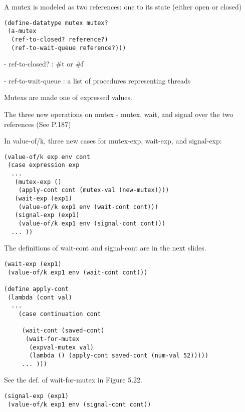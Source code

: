 \documentclass{article}
\begin{document}
\begin{huge}

A mutex is modeled as two references: one to its state (either open or closed)

\begin{lstlisting}
(define-datatype mutex mutex?
 (a-mutex
  (ref-to-closed? reference?)
  (ref-to-wait-queue reference?)))
\end{lstlisting}

- ref-to-closed? : \#t or \#f 

- ref-to-wait-queue : a list of procedures representing threads

Mutexs are made one of expressed values.

The three new operations on mutex \al
- mutex, wait, and signal over the two references (See P.187)


In value-of/k, three new cases for mutex-exp, wait-exp, and signal-exp:
\begin{lstlisting}
(value-of/k exp env cont
 (case expression exp 
  ...
   (mutex-exp ()
    (apply-cont cont (mutex-val (new-mutex))))
   (wait-exp (exp1)
    (value-of/k exp1 env (wait-cont cont)))
   (signal-exp (exp1)
    (value-of/k exp1 env (signal-cont cont)))
  ... ))
\end{lstlisting}

The definitions of wait-cont and signal-cont are in the next slides.


\begin{lstlisting}
(wait-exp (exp1)
 (value-of/k exp1 env (wait-cont cont)))

(define apply-cont
 (lambda (cont val)
  ...
    (case continuation cont
    
     (wait-cont (saved-cont)
      (wait-for-mutex
       (expval-mutex val)
       (lambda () (apply-cont saved-cont (num-val 52)))))
     ... )))
 \end{lstlisting}
 
 See the def. of wait-for-mutex in Figure 5.22.
   
\begin{lstlisting}
(signal-exp (exp1)
 (value-of/k exp1 env (signal-cont cont))


\end{lstlisting}
\end{huge}
\end{document}
